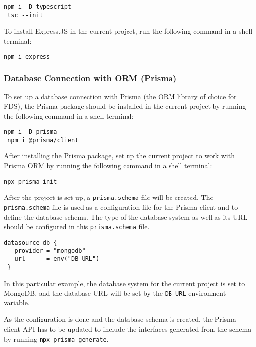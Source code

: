    \begin{lstlisting}[caption={Installing and configuring TypeScript compiler (Shell)}]
 npm i -D typescript
 tsc --init
   \end{lstlisting}
  
  To install Express.JS in the current project, run the following command in a shell terminal:
  
   \begin{lstlisting}[caption={Installing Express.JS (Shell)}]
 npm i express
   \end{lstlisting}
  
  \subsubsection{Database Connection with ORM (Prisma)}
   To set up a database connection with Prisma (the ORM library of choice for FDS), the Prisma package should be installed in the current project by running the following command in a shell terminal:

   \begin{lstlisting}[caption={Installing Prisma (Shell)}]
 npm i -D prisma 
 npm i @prisma/client
   \end{lstlisting}

   After installing the Prisma package, set up the current project to work with Prisma ORM by running the following command in a shell terminal:

   \begin{lstlisting}[caption={Set up project with Prisma}]
 npx prisma init
   \end{lstlisting}
   
   After the project is set up, a \verb;prisma.schema; file will be created. The \verb;prisma.schema; file is used as a configuration file for the Prisma client and to define the database schema. The type of the database system as well as its URL should be configured in this \verb;prisma.schema; file. 

   \begin{lstlisting}[caption={Configuring database type and URL (Prisma)}]
 datasource db {
   provider = "mongodb"
   url      = env("DB_URL")
 }  
   \end{lstlisting}

   In this particular example, the database system for the current project is set to MongoDB, and the database URL will be set by the \verb;DB_URL; environment variable.

   As the configuration is done and the database schema is created, the Prisma client API has to be updated to include the interfaces generated from the schema by running \verb;npx prisma generate;.
   
